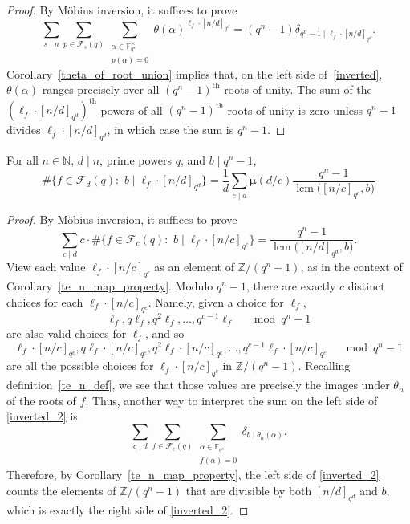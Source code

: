 \documentclass[Unicode,ALCO]{cedram}
\DeclareMathOperator{\lcm}{lcm}
\newcommand{\F}{\mathbb{F}}
\newcommand{\CF}{\mathcal{F}}
\newcommand{\N}{\mathbb{N}}
\newcommand{\Z}{\mathbb{Z}}
\newcommand{\moebius}{\pmb{\mu}}
\newcommand{\te}{\theta}
\begin{document}
\begin{proof}
By M\"obius inversion, it suffices to prove
\begin{equation}
\label{inverted}
\sum_{s \mid n}
\sum_{p \in \CF_s (q)}
\sum_{\substack{\alpha \in \F_{q^s}^\times \\ p(\alpha) = 0}}
\te (\alpha)^{\ell_f \cdot [n/d]_{q^d}}
=
(q^n - 1) \delta_{q^n - 1 \mid \ell_f \cdot [n/d]_{q^d}}.
\end{equation}
Corollary~\ref{theta_of_root_union} implies that, on the left side of~\eqref{inverted}, \(\te(\alpha)\) ranges precisely over all \((q^n-1)^\text{th}\) roots of unity.
The sum of the \((\ell_f \cdot [n/d]_{q^d})^\text{th}\) powers of all \((q^n-1)^\text{th}\) roots of unity is zero unless \(q^n-1\) divides \(\ell_f \cdot [n/d]_{q^d}\), in which case the sum is \(q^n-1\).
\end{proof}


\begin{lemma}
\label{post_pre_pre_main}
For all \(n \in \N, \, d \mid n\), prime powers \(q\), and \(b \mid q^n-1\),
\begin{equation}
\# \{f \in \CF_d (q) : \, \, b \mid \ell_f \cdot [n/d]_{q^d}\}
=
\frac{1}{d}
\sum_{c \mid d}
\moebius(d/c)
\frac{q^n-1}{\lcm \big (
[n/c]_{q^c}, b
\big )}
\end{equation}
\end{lemma}


\begin{proof}
By M\"obius inversion, it suffices to prove
\begin{equation}
\label{inverted_2}
\sum_{c \mid d} c \cdot \# \{f \in \CF_c (q) : \, \, b \mid \ell_f \cdot [n/c]_{q^c} \}
=
\frac{q^n-1}{\lcm \big (
[n/d]_{q^d}, b
\big )}.
\end{equation}
View each value \(\ell_f \cdot [n/c]_{q^c}\) as an element of \(\Z / (q^n-1)\), as in the context of Corollary~\ref{te_n_map_property}.
Modulo \(q^n-1\), there are exactly \(c\) distinct choices for each \(\ell_f \cdot [n/c]_{q^c}\).
Namely, given a choice for \(\ell_f\),
\[
\ell_f , q\ell_f , q^2\ell_f , \ldots, q^{c-1}\ell_f \quad \mod q^n-1
\]
are also valid choices for \(\ell_f\), and so
\[
\ell_f \cdot [n/c]_{q^c}, q\ell_f \cdot [n/c]_{q^c} , q^2 \ell_f \cdot [n/c]_{q^c} , \ldots, q^{c-1}\ell_f \cdot [n/c]_{q^c} \quad \mod q^n-1
\]
are all the possible choices for \(\ell_f \cdot [n/c]_{q^c}\) in \(\Z / (q^n-1)\).
Recalling definition~\eqref{te_n_def}, we see that those values are precisely the images under \(\te_n\) of the roots of \(f\).
Thus, another way to interpret the sum on the left side of \eqref{inverted_2} is
\[
\sum_{c \mid d} \sum_{f \in \CF_c (q)} \sum_{\substack{\alpha \in \F_{q^c} \\ f(\alpha) = 0}} \delta_{b \mid \te_n(\alpha)}.
\]
Therefore, by Corollary~\ref{te_n_map_property}, the left side of \eqref{inverted_2} counts the elements of \(\Z / (q^n-1)\) that are divisible by both \([n/d]_{q^d}\) and \(b\),
which is exactly the right side of \eqref{inverted_2}.
\end{proof}
\end{document}
